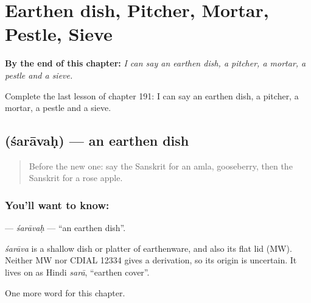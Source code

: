 
\chapter{Earthen dish, Pitcher, Mortar, Pestle, Sieve}
\label{ch:sa-earthen-dish-pitcher-mortar-pestle-sieve}

\begin{chapteropening}
\textbf{By the end of this chapter:} \emph{I can say an earthen dish, a pitcher, a mortar, a pestle and a sieve.}

Complete the last lesson of chapter 191: I can say an earthen dish, a pitcher, a mortar, a pestle and a sieve.
\end{chapteropening}

\section[\texorpdfstring{\sk{शरावः} (śarāvaḥ)}{शरावः (śarāvaḥ)}]{ (śarāvaḥ) — an earthen dish}

\label{lesson:SA-C191-saravah}



\begin{quote}
Before the new one: say the Sanskrit for an amla, gooseberry, then the Sanskrit for a rose apple.
\end{quote}

\subsection*{You'll want to know: }
\textbf{} — \emph{śarāvaḥ} — \textquotedblleft{}an earthen dish\textquotedblright{}.

\begin{cousinweb}
\emph{śarāva} is a shallow dish or platter of earthenware, and also its flat lid (MW). Neither MW nor CDIAL 12334 gives a derivation, so its origin is uncertain. It lives on as Hindi \emph{sarā}, \textquotedblleft{}earthen cover\textquotedblright{}.
\end{cousinweb}

\begin{grammarlens}[title={What you've built}]
One more word for this chapter.
\end{grammarlens}


